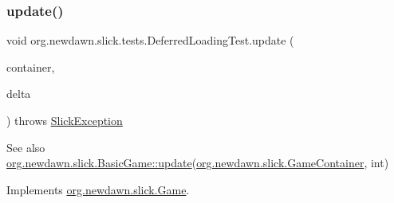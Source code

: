 \subsubsection{\texorpdfstring{update()}{update()}}
{\footnotesize\ttfamily void org.\+newdawn.\+slick.\+tests.\+Deferred\+Loading\+Test.\+update (\begin{DoxyParamCaption}\item[{\mbox{\hyperlink{classorg_1_1newdawn_1_1slick_1_1_game_container}{Game\+Container}}}]{container,  }\item[{int}]{delta }\end{DoxyParamCaption}) throws \mbox{\hyperlink{classorg_1_1newdawn_1_1slick_1_1_slick_exception}{Slick\+Exception}}\hspace{0.3cm}{\ttfamily [inline]}}

\begin{DoxySeeAlso}{See also}
\mbox{\hyperlink{classorg_1_1newdawn_1_1slick_1_1_basic_game_acfe6fa05aef83bff1631af91a3e4bd20}{org.\+newdawn.\+slick.\+Basic\+Game\+::update}}(\mbox{\hyperlink{classorg_1_1newdawn_1_1slick_1_1_game_container}{org.\+newdawn.\+slick.\+Game\+Container}}, int) 
\end{DoxySeeAlso}


Implements \mbox{\hyperlink{interfaceorg_1_1newdawn_1_1slick_1_1_game_ab07b2e9463ee4631620dde0de25bdee8}{org.\+newdawn.\+slick.\+Game}}.


